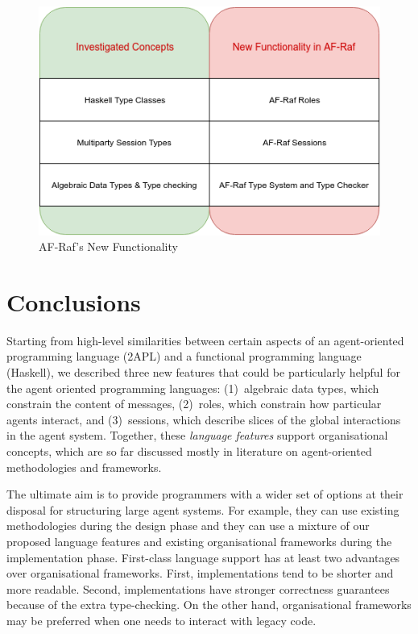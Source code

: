 \documentclass[a4paper,12pt,oneside,fleqn]{book} %
\newcommand{\todo}[1]{[\textcolor{red}{TODO}: #1]}
\begin{document}
\begin{figure}\footnotesize %
\includegraphics{NewFunctionality.png}
\caption{AF-Raf's New Functionality}
\label{fig:newFunct}
\end{figure} %



\chapter{Conclusions}\label{ch:conc} %


Starting from high-level similarities between certain aspects of an
agent-oriented programming language (2APL) and a functional programming
language (Haskell), we described three new features that could be
particularly helpful for the agent oriented programming languages:
(1)~algebraic data types, which constrain the content of messages,
(2)~roles, which constrain how particular agents interact, and
(3)~sessions, which describe slices of the global interactions in the agent
system. Together, these \emph{language features} support organisational
concepts, which are so far discussed mostly in literature on
agent-oriented methodologies and frameworks.

The ultimate aim is to provide programmers with a wider set of options at
their disposal for structuring large agent systems. For example, they can
use existing methodologies during the design phase and they can use a
mixture of our proposed language features and existing organisational
frameworks during the implementation phase. First-class language support
has at least two advantages over organisational frameworks. First,
implementations tend to be shorter and more readable. Second,
implementations have stronger correctness guarantees because of the extra
type-checking. On the other hand, organisational frameworks may be
preferred when one needs to interact with legacy code.
\end{document}

